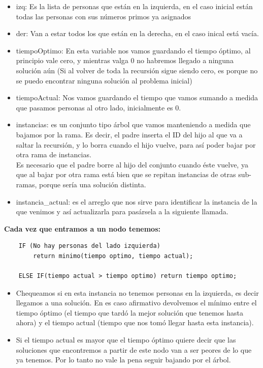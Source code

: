 \begin{itemize}
\item izq: Es la lista de personas que están en la izquierda, en el caso inicial están todas las personas con sus números primos ya asignados
\item der: Van a estar todos los que están en la derecha, en el caso inical está vacía.
\item tiempoOptimo: En esta  variable nos vamos guardando el tiempo óptimo, al principio vale cero, y mientras valga 0 no habremos llegado a ninguna solución aún (Si al volver de toda la recursión sigue siendo cero, es porque no se puedo encontrar ninguna solución al problema inicial)
\item tiempoActual: Nos vamos guardando el tiempo que vamos sumando a medida que pasamos personas al otro lado, inicialmente es 0.  
\item instancias: es un conjunto tipo árbol que vamos manteniendo a medida que bajamos por la rama. Es decir, el padre inserta el ID del hijo al que va a saltar la recursión, y lo borra cuando el hijo vuelve, para así poder bajar por otra rama de instancias. \\ Es necesario que el padre borre al hijo del conjunto cuando éste vuelve, ya que al bajar por otra rama está bien que se repitan instancias de otras sub-ramas, porque sería una solución distinta. 
\item instancia\_actual: es el arreglo que nos sirve para identificar la instancia de la que venimos y así actualizarla para pasársela a la siguiente llamada.
\end{itemize}

\textbf{Cada vez que entramos a un nodo tenemos:}
\begin{lstlisting}
    IF (No hay personas del lado izquierda) 
        return minimo(tiempo optimo, tiempo actual); 
        
    ELSE IF(tiempo actual > tiempo optimo) return tiempo optimo;
\end{lstlisting}
\begin{itemize}
\item Chequeamos si en esta instancia no tenemos personas en la izquierda, es decir llegamos a una solución. En es caso afirmativo devolvemos el mínimo entre el tiempo óptimo (el tiempo que tardó la mejor solución que tenemos hasta ahora) y el tiempo actual (tiempo que nos tomó llegar hasta esta instancia).
\item Si el tiempo actual es mayor que el tiempo óptimo quiere decir que las soluciones que encontremos a partir de este nodo van a ser peores de lo que ya tenemos. Por lo tanto no vale la pena seguir bajando por el árbol. 
\end{itemize}

